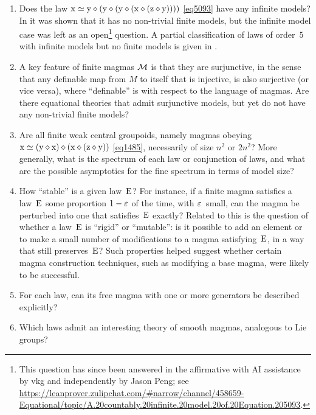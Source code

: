 \begin{enumerate}[resume*]
  \item Does the law $\mathrm{x} \simeq \mathrm{y} \diamond (\mathrm{y} \diamond (\mathrm{y} \diamond (\mathrm{x} \diamond (\mathrm{z} \diamond \mathrm{y}))))$ \eqref{eq5093} have any infinite models? In \cite{Kisielewicz2} it was shown that it has no non-trivial finite models, but the infinite model case was left as an open\footnote{This question has since been answered in the affirmative with AI assistance by vkg and independently by Jason Peng; see \url{https://leanprover.zulipchat.com/#narrow/channel/458659-Equational/topic/A.20countably.20infinite.20model.20of.20Equation.205093}.} question.  A partial classification of laws of order~$5$ with infinite models but no finite models is given in \cite[Chapter~20]{ETP_blueprint}.

  \item A key feature of finite magmas ${\mathcal{M}}$ is that they are surjunctive, in the sense that any definable map from $M$ to itself that is injective, is also surjective (or vice versa), where ``definable'' is with respect to the language of magmas.  Are there equational theories that admit surjunctive models, but yet do not have any non-trivial finite models?

  \item Are all finite weak central groupoids, namely magmas obeying $\mathrm{x} \simeq (\mathrm{y} \diamond \mathrm{x}) \diamond (\mathrm{x} \diamond (\mathrm{z} \diamond \mathrm{y}))$ \eqref{eq1485}, necessarily of size $n^2$ or $2n^2$?  More generally, what is the spectrum of each law or conjunction of laws, and what are the possible asymptotics for the fine spectrum in terms of model size?

  \item How ``stable'' is a given law~$\mathrm{E}$?  For instance, if a finite magma satisfies a law~$\mathrm{E}$ some proportion $1-\varepsilon$ of the time, with $\varepsilon$~small, can the magma be perturbed into one that satisfies~$\mathrm{E}$ exactly?  Related to this is the question of whether a law~$\mathrm{E}$ is ``rigid'' or ``mutable'': is it possible to add an element or to make a small number of modifications to a magma satisfying~$\mathrm{E}$, in a way that still preserves~$\mathrm{E}$?  Such properties helped suggest whether certain magma construction techniques, such as modifying a base magma, were likely to be successful.

  \item For each law, can its free magma with one or more generators be described explicitly?

  \item Which laws admit an interesting theory of smooth magmas, analogous to Lie groups?
\end{enumerate}

